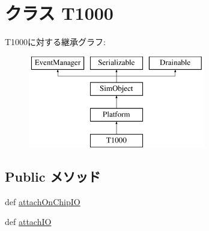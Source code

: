 \hypertarget{classT1000_1_1T1000}{
\section{クラス T1000}
\label{classT1000_1_1T1000}
}
T1000に対する継承グラフ:\begin{figure}[H]
\begin{center}
\leavevmode
\includegraphics[height=4cm]{classT1000_1_1T1000}
\end{center}
\end{figure}
\subsection*{Public メソッド}
\begin{DoxyCompactItemize}
\item 
def \hyperlink{classT1000_1_1T1000_abd74cec934f25d2881d5fdd0d5e7f512}{attachOnChipIO}
\item 
def \hyperlink{classT1000_1_1T1000_ac750675f6d6de3ad52f8c5b03ee45a65}{attachIO}
\end{DoxyCompactItemize}
